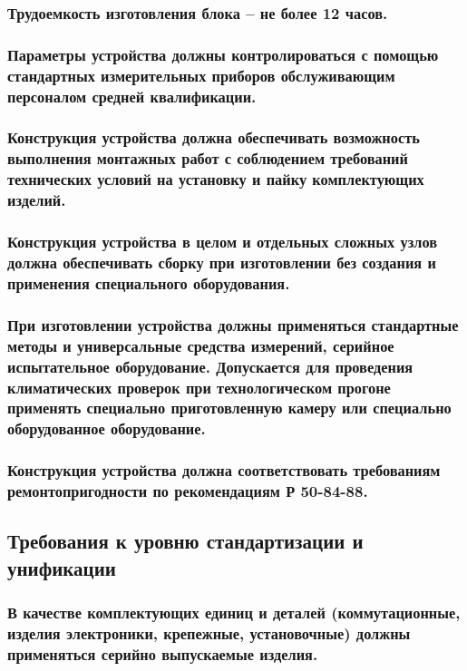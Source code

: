 \documentclass[a4paper]{bsuir-tor}
\begin{document}
\subsubsection{Трудоемкость изготовления блока – не более 12 часов.}

\subsubsection{Параметры устройства должны контролироваться с
  помощью стандартных измерительных приборов
  обслуживающим персоналом средней квалификации.}

\subsubsection{Конструкция устройства
  должна обеспечивать возможность
  выполнения монтажных работ
  с соблюдением требований технических условий
  на установку и пайку комплектующих изделий.}

\subsubsection{Конструкция устройства в целом
  и отдельных сложных узлов
  должна обеспечивать сборку при изготовлении без создания и применения
  специального оборудования.}

\subsubsection {При изготовлении устройства должны применяться стандартные
  методы и универсальные средства измерений,
  серийное испытательное оборудование.
  Допускается для проведения климатических проверок
  при технологическом прогоне применять специально
  приготовленную камеру или специально оборудованное оборудование.}

\subsubsection{ Конструкция устройства должна соответствовать
  требованиям ремонтопригодности по рекомендациям Р 50-84-88.}

\subsection{Требования к уровню стандартизации и унификации}

\subsubsection{В качестве комплектующих единиц и деталей
  (коммутационные, изделия электроники, крепежные, установочные)
  должны применяться серийно выпускаемые изделия.}
\end{document}
